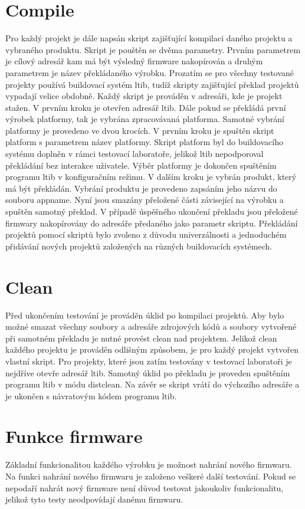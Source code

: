 \section{Compile}
Pro každý projekt je dále napsán skript zajišťující kompilaci daného projektu a vybraného produktu. Skript je pouštěn se dvěma parametry. Prvním parametrem je cílový adresář kam má být výsledný firmware nakopírován a druhým parametrem je název překládaného výrobku. Prozatím se pro všechny testované projekty používá buildovací systém ltib, tudíž skripty zajišťující překlad projektů vypadají velice obdobně. Každý skript je prováděn v adresáři, kde je projekt stažen. V prvním kroku je otevřen adresář ltib. Dále pokud se překládá první výrobek platformy, tak je vybrána zpracovávaná platforma. Samotné vybrání platformy je provedeno ve dvou krocích. V prvním kroku je spuštěn skript platform s parametrem název platformy. Skript platform byl do buildovacího systému doplněn v rámci testovací laboratoře, jelikož ltib nepodporoval překládání bez interakce uživatele. Výběr platformy je dokončen spuštěním programu ltib v konfiguračním režimu. V dalším kroku je vybrán produkt, který má být překládán. Vybrání produktu je provedeno zapsáním jeho názvu do souboru appname. Nyní jsou smazány přeložené části závisející na výrobku a spuštěn samotný překlad. V případě úspěšného ukončení překladu jsou přeložené firmwary nakopírovány do adresáře předaného jako parametr skriptu. Překládání projektů pomocí skriptů bylo zvoleno z důvodu univerzálnosti a jednoduchém přidávání nových projektů založených na různých buildovacích systémech.

\section{Clean}
Před ukončením testování je prováděn úklid po kompilaci projektů. Aby bylo možné smazat všechny soubory a adresáře zdrojových kódů a soubory vytvořené při samotném překladu je nutné provést clean nad projektem. Jelikož clean každého projektu je prováděn odlišným způsobem, je pro každý projekt vytvořen vlastní skript. Pro projekty, které jsou zatím testovány v testovací laboratoři je nejdříve otevře adresář ltib. Samotný úklid po překladu je proveden spuštěním programu ltib v módu distclean. Na závěr se skript vrátí do výchozího adresáře a je ukončen s návratovým kódem programu ltib.

\section{Funkce firmware}
Základní funkcionalitou každého výrobku je možnost nahrání nového firmwaru. Na funkci nahrání nového firmwaru je založeno veškeré další testování. Pokud se nepodaří nahrát nový firmware není důvod testovat jakoukoliv funkcionalitu, jelikož tyto testy neodpovídají danému firmwaru.

